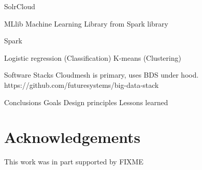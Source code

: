 \documentclass[9pt,twocolumn,twoside]{styles/osajnl}
\begin{document}
	SolrCloud
	

	MLlib
	Machine Learning Library from Spark
	library
	

	Spark
	

	Logistic regression (Classification)
K-means (Clustering)
	

	

	

	

	

	

	

	





Software Stacks
Cloudmesh is primary, uses BDS under hood.
https://github.com/futuresystems/big-data-stack


Conclusions
Goals
Design principles
Lessons learned




\section*{Acknowledgements}

This work was in part supported by FIXME




 
\end{document}
